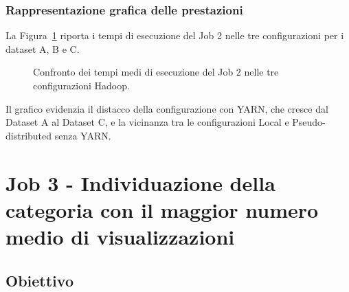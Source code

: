 \documentclass[12pt, a4paper]{article}
\begin{document}
\needspace{10cm}
\subsubsection{Rappresentazione grafica delle prestazioni}

La Figura~\ref{fig:job2tempi} riporta i tempi
di esecuzione del Job 2 nelle tre configurazioni
per i dataset A, B e C.

\begin{figure}[H]
\centering


\caption{Confronto dei tempi medi di esecuzione del Job 2 nelle tre configurazioni Hadoop.}
\label{fig:job2tempi}

\end{figure}

Il grafico evidenzia il distacco della configurazione
con YARN, che cresce dal Dataset A al Dataset C,
e la vicinanza tra le configurazioni Local
e Pseudo-distributed senza YARN.

\section{Job 3 - Individuazione della categoria con il maggior numero medio di visualizzazioni}
\label{sec:job3}

\subsection{Obiettivo}
\end{document}
